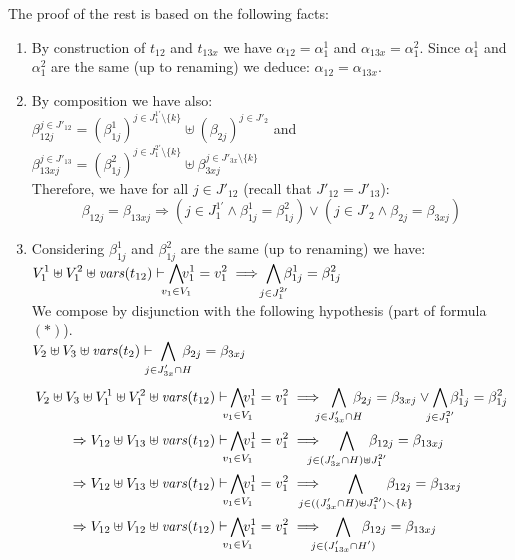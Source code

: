 \documentclass[runningheads]{llncs}
\begin{document}
\begin{enumerate}
The proof of the rest  is based on the following facts: 
\begin{enumerate}
\item     By construction of  $t_{12}$ and $t_{13x}$ we have $\alpha_{12}=
\alpha^1_{1}$ and $\alpha_{13x}=\alpha^2_{1}$. Since  $\alpha^1_{1}$ and  $\alpha^2_{1}$ are the same (up to renaming) we deduce: 
$\alpha_{12} = \alpha_{13x}$.
\item By composition we have also: \\ $\beta_{12j}^{j\in J'_{12}}= (\beta^1_{1j})^{j \in J^{1 \prime}_{1} \setminus \{k\}} \uplus   (\beta_{2j})^{j \in J'_{2} }$
and $\beta_{13xj}^{j\in J'_{13}}= (\beta^2_{1j})^{j \in J^{2 \prime}_{1}  \setminus \{k\}}  \uplus \beta_{3xj}^{j \in J'_{3x}  \setminus \{k\}}$\\
Therefore, we have for all $j\in J'_{12}$ (recall that $J'_{12}=J'_{13}$):  \[\beta_{12j} = \beta_{13xj} \Rightarrow (j\in J^{1\prime}_1 \land \beta^1_{1j} = \beta^2_{1j}) \vee (j\in J'_2 \land \beta_{2j}= \beta_{3xj})\]
\item 
Considering $\beta^1_{1j}$ and  $\beta^2_{1j}$  are the same (up to renaming)  we have: \\
${\displaystyle V^1_{1} \uplus V^2_{1} \uplus \fvars{t_{12}} \vdash \bigwedge_\subbox{v_1\in V_1}\!\! v^1_1=v^2_1\implies \bigwedge_\subbox{j \in J^{2 \prime}_1} \beta^1_{1j}= \beta^2_{1j}}$\\
We compose by disjunction with the following hypothesis (part of formula $(*)$).\\ $V_{2} \uplus V_{3} \uplus \fvars{t_2}  \vdash {\displaystyle \bigwedge_\subbox{j \in J'_{3x} \cap H} \beta_{2j} = \beta_{3xj}}$
\begin{align*}
 V_{2} \uplus V_{3}  \uplus V^1_{1} \uplus V^2_{1} \uplus \fvars{t_{12}}\vdash &    \bigwedge_\subbox{v_1\in V_1}\!\! v^1_1=v^2_1 \implies {\displaystyle \bigwedge_\subbox{j \in J'_{3x} \cap H} \beta_{2j} = \beta_{3xj}} \vee {\displaystyle \bigwedge_\subbox{j \in J^{2 \prime}_1} \beta^1_{1j}= \beta^2_{1j}}\\
\Rightarrow  V_{12} \uplus V_{13}  \uplus \fvars{t_{12}}\vdash & \bigwedge_\subbox{v_1\in V_1}\!\! v^1_1=v^2_1\implies {\displaystyle \bigwedge_\subbox{j \in (J'_{3x}   \cap H)\uplus J^{2 \prime}_1 } \beta_{12j} = \beta_{13xj}} \\  
\Rightarrow  V_{12} \uplus V_{13}  \uplus \fvars{t_{12}}\vdash & \bigwedge_\subbox{v_1\in V_1}\!\! v^1_1=v^2_1\implies {\displaystyle \bigwedge_\subbox{j \in    ((J'_{3x}   \cap H)\uplus J^{2 \prime}_1)\setminus \{k\} } \beta_{12j} = \beta_{13xj}} \\
\Rightarrow    V_{12} \uplus V_{12}  \uplus \fvars{t_{12}}\vdash & \bigwedge_\subbox{v_1\in V_1}\!\! v^1_1=v^2_1\implies {\displaystyle \bigwedge_\subbox{j \in (J'_{13x}   \cap H') } \beta_{12j} = \beta_{13xj}}
\end{align*}
\end{enumerate}


\end{enumerate}
\end{document}
